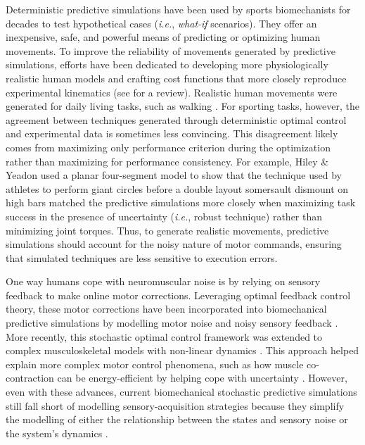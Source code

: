 \documentclass[10pt,letterpaper]{article}
\newcommand{\comEC}[1]{~\linebreak\noindent\colorbox{green}{\parbox{\dimexpr\columnwidth-1\fboxsep}{[EC: #1]}}}
\begin{document}
Deterministic predictive simulations have been used by sports biomechanists for decades to test hypothetical cases (\textit{i.e.}, \textit{what-if} scenarios).
They offer an inexpensive, safe, and powerful means of predicting or optimizing human movements.
To improve the reliability of movements generated by predictive simulations, efforts have been dedicated to developing more physiologically realistic human models and crafting cost functions that more closely reproduce experimental kinematics (see \cite{febrer2023predictive} for a review).
Realistic human movements were generated for daily living tasks, such as walking \cite{ezati2019review}.
For sporting tasks, however, the agreement between techniques generated through deterministic optimal control and experimental data is sometimes less convincing.
This disagreement likely comes from maximizing only performance criterion during the optimization rather than maximizing for performance consistency.  
For example, Hiley \& Yeadon \cite{hiley2016investigating} used a planar four-segment model to show that the technique used by athletes to perform giant circles before a double layout somersault dismount on high bars matched the predictive simulations more closely when maximizing task success in the presence of uncertainty (\textit{i.e.}, robust technique) rather than minimizing joint torques.
Thus, to generate realistic movements, predictive simulations should account for the noisy nature of motor commands, ensuring that simulated techniques are less sensitive to execution errors.


One way humans cope with neuromuscular noise is by relying on sensory feedback to make online motor corrections.
Leveraging optimal feedback control theory, these motor corrections have been incorporated into biomechanical predictive simulations by modelling motor noise and noisy sensory feedback \cite{todorov2004optimality}. 
More recently, this stochastic optimal control framework was extended to complex musculoskeletal models with non-linear dynamics \cite{van2022approximate}. 
This approach helped explain more complex motor control phenomena, such as how muscle co-contraction can be energy-efficient by helping cope with uncertainty \cite{van2022approximate, berret2024co}.
However, even with these advances, current biomechanical stochastic predictive simulations still fall short of modelling sensory-acquisition strategies because they simplify the modelling of either the relationship between the states and sensory noise \cite{van2022approximate} or the system's dynamics \cite{todorov2005stochastic}.
\end{document}
